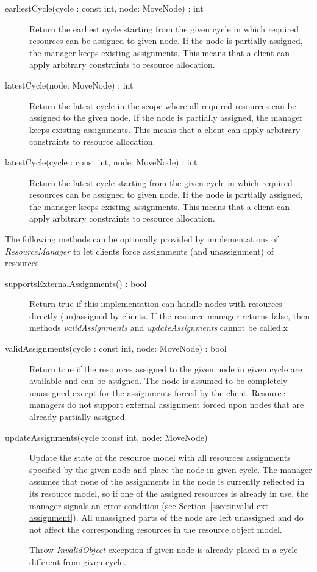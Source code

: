 \documentclass[a4paper,twoside]{tce}
\begin{document}
\begin{description}
\item[earliestCycle(cycle : const int, node: MoveNode) : int]%
  Return the earliest cycle starting from the given cycle in which required
  resources can be assigned to given node. If the node is partially
  assigned, the manager keeps existing assignments. This means that a client
  can apply arbitrary constraints to resource allocation.

\item[latestCycle(node: MoveNode) : int]%
  Return the latest cycle in the scope where all required resources can be
  assigned to the given node. If the node is partially assigned, the manager
  keeps existing assignments. This means that a client can apply arbitrary
  constraints to resource allocation.

\item[latestCycle(cycle : const int, node: MoveNode) : int]%
  Return the latest cycle starting from the given cycle in which required
  resources can be assigned to given node. If the node is partially
  assigned, the manager keeps existing assignments. This means that a client
  can apply arbitrary constraints to resource allocation.
\end{description}

The following methods can be optionally provided by implementations of
\emph{ResourceManager} to let clients force assignments (and unassignment)
of resources.

\begin{description}
\item[supportsExternalAssignments() : bool]%
  Return true if this implementation can handle nodes with resources
  directly (un)assigned by clients. If the resource manager returns false,
  then methods \emph{validAssignments} and \emph{updateAssignments} cannot
  be called.x

\item[validAssignments(cycle : const int, node: MoveNode) : bool]%
  Return true if the resources assigned to the given node in given cycle are
  available and can be assigned. The node is assumed to be completely
  unassigned except for the assignments forced by the client.
%
%
  Resource managers do not support external assignment forced upon nodes
  that are already partially assigned.

\item[updateAssignments(cycle :const int, node: MoveNode)]%
  Update the state of the resource model with all resources assignments
  specified by the given node and place the node in given cycle. The manager
  assumes that none of the assignments in the node is currently reflected in
  its resource model, so if one of the assigned resources is already in use,
  the manager signals an error condition (see
  Section~\ref{ssec:invalid-ext-assignment}). All unassigned parts of the
  node are left unassigned and do not affect the corresponding resources in
  the resource object model.

  Throw \emph{InvalidObject} exception if given node is already placed in a
  cycle different from given cycle.
\end{description}
\end{document}
